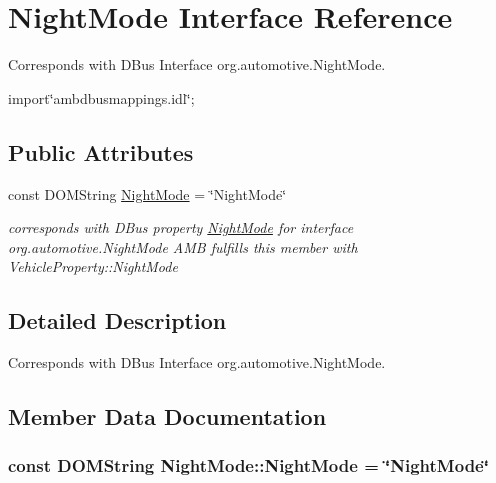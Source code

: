 \hypertarget{interfaceNightMode}{\section{Night\+Mode Interface Reference}
\label{interfaceNightMode}
}


Corresponds with D\+Bus Interface org.\+automotive.\+Night\+Mode.  




{\ttfamily import\char`\"{}ambdbusmappings.\+idl\char`\"{};}

\subsection*{Public Attributes}
\begin{DoxyCompactItemize}
\item 
const D\+O\+M\+String \hyperlink{interfaceNightMode_aa4b90c012d03361c12ddb8536fe79993}{Night\+Mode} = \char`\"{}Night\+Mode\char`\"{}
\begin{DoxyCompactList}\small\item\em corresponds with D\+Bus property \hyperlink{interfaceNightMode}{Night\+Mode} for interface org.\+automotive.\+Night\+Mode A\+M\+B fulfills this member with Vehicle\+Property\+::\+Night\+Mode \end{DoxyCompactList}\end{DoxyCompactItemize}


\subsection{Detailed Description}
Corresponds with D\+Bus Interface org.\+automotive.\+Night\+Mode. 

\subsection{Member Data Documentation}
\hypertarget{interfaceNightMode_aa4b90c012d03361c12ddb8536fe79993}{
\subsubsection[{Night\+Mode}]{\setlength{\rightskip}{0pt plus 5cm}const D\+O\+M\+String Night\+Mode\+::\+Night\+Mode = \char`\"{}Night\+Mode\char`\"{}}}\label{interfaceNightMode_aa4b90c012d03361c12ddb8536fe79993}



